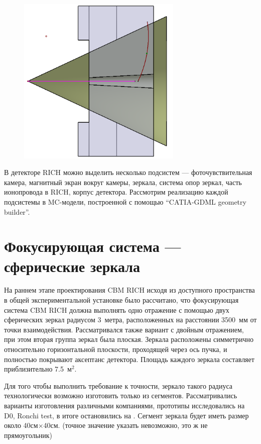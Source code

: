 \begin{figure}[H]
\centering
\includegraphics[width=0.7\textwidth]{pictures/RICH_construction.png}
\caption{}
\label{fig:RICHconstruction}
\end{figure}

В детекторе RICH можно выделить несколько подсистем --- фоточувствительная камера, магнитный экран вокруг камеры, зеркала, система опор зеркал, часть ионопровода в RICH, корпус детектора. Рассмотрим реализацию каждой подсистемы в MC-модели, построенной с помощью ``CATIA-GDML geometry builder''.

\section{Фокусирующая система --- сферические зеркала}\label{sec:RICHgeoMirror}

На раннем этапе проектирования CBM RICH исходя из доступного пространства в общей экспериментальной установке было рассчитано, что фокусирующая система CBM RICH должна выполнять одно отражение с помощью двух сферических зеркал радиусом 3~метра, расположенных на расстоянии 3500~мм от точки взаимодействия. Рассматривался также вариант с двойным отражением, при этом вторая группа зеркал была плоская. Зеркала расположены симметрично относительно горизонтальной плоскости, проходящей через ось пучка, и полностью покрывают аксептанс детектора. Площадь каждого зеркала составляет приблизительно 7.5~м$^2$.

Для того чтобы выполнить требование к точности, зеркало такого радиуса технологически возможно изготовить только из сегментов. Рассматривались варианты изготовления различными компаниями, прототипы исследовались на \todo D0, Ronchi test, в итоге остановились на \todo.
Сегмент зеркала будет иметь размер около 40см$\times$40см. (точное значение указать невозможно, это ж не прямоугольник)

